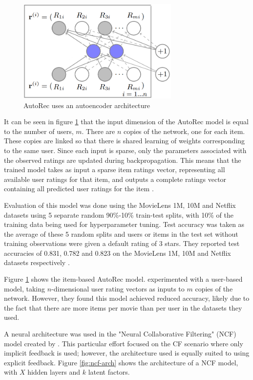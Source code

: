 \begin{figure}[H]
\centering
\includegraphics[width=8cm]{Figures/2_autoRec.png}
\decoRule
\caption[AutoRec]{AutoRec uses an autoencoder architecture  \parencite{sedhain2015autorec}}
\label{fig:autorec-arch}
\end{figure}

It can be seen in figure \ref{fig:autorec-arch} that the input dimension of the AutoRec model is equal to the number of users, $m$. There are $n$ copies of the network, one for each item. These copies are linked so that there is shared learning of weights corresponding to the same user. Since each input is sparse, only the parameters associated with the observed ratings are updated during backpropagation. This means that the trained model takes as input a sparse item ratings vector, representing all available user ratings for that item, and outputs a complete ratings vector containing all predicted user ratings for the item \parencite{sedhain2015autorec}.

Evaluation of this model was done using the MovieLens 1M, 10M and Netflix datasets using 5 separate random 90\%-10\% train-test splits, with 10\% of the training data being used for hyperparameter tuning. Test accuracy was taken as the average of these 5 random splits and users or items in the test set without training observations were given a default rating of 3 stars. They reported test accuracies of 0.831, 0.782 and 0.823 on the MovieLens 1M, 10M and Netflix datasets respectively \parencite{sedhain2015autorec}.

Figure \ref{fig:autorec-arch} shows the item-based AutoRec model.
\citeauthor{sedhain2015autorec} experimented with a user-based model, taking $n$-dimensional user rating vectors as inputs to $m$ copies of the network. However, they found this model achieved reduced accuracy, likely due to the fact that there are more items per movie than per user in the datasets they used.

A neural architecture was used in the "Neural Collaborative Filtering" (NCF) model created by \cite{he2017neural}. This particular effort focused on the CF scenario where only implicit feedback is used; however, the architecture used is equally suited to using explicit feedback. Figure \ref{fig:ncf-arch} shows the architecture of a NCF model, with $X$ hidden layers and $k$ latent factors.


